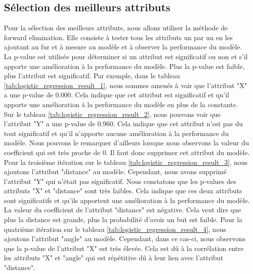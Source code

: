 \documentclass[12pt]{article}
\begin{document}
\subsection{Sélection des meilleurs attributs}
\label{sec:selection_attributs}
Pour la sélection des meilleurs attributs, nous allons utiliser la méthode de forward elimination.
Elle consiste à tester tous les attributs un par un en les ajoutant au fur et à mesure au modèle et à observer la performance du modèle.
La p-value est utilisée pour déterminer si un attribut est significatif ou non et s'il apporte une amélioration à la performance du modèle.
Plus la p-value est faible, plus l'attribut est significatif.
\newline\newline
Par exemple, dans le tableau \ref{tab:logistic_regression_result_1}, nous sommes amenés à voir que l'attribut "X" a une p-value de 0.000.
Cela indique que cet attribut est significatif et qu'il apporte une amélioration à la performance du modèle en plus de la constante.
\newline\newline
Sur le tableau \ref{tab:logistic_regression_result_2}, nous pouvons voir que l'attribut "Y" a une p-value de 0.960.
Cela indique que cet attribut n'est pas du tout significatif et qu'il n'apporte aucune amélioration à la performance du modèle.
Nous pouvons le remarquer d'ailleurs lorsque nous observons la valeur du coefficient qui est très proche de 0.
Il faut donc supprimer cet attribut du modèle.
\newline\newline
Pour la troisième itération sur le tableau \ref{tab:logistic_regression_result_3}, nous ajoutons l'attribut "distance" au modèle.
Cependant, nous avons supprimé l'attribut "Y" qui n'était pas significatif.
Nous constatons que les p-values des attributs "X" et "distance" sont très faibles.
Cela indique que ces deux attributs sont significatifs et qu'ils apportent une amélioration à la performance du modèle.
La valeur du coefficient de l'attribut "distance" est négative. 
Cela veut dire que plus la distance est grande, plus la probabilité d'avoir un but est faible.
\newline\newline
Pour la quatrième itération sur le tableau \ref{tab:logistic_regression_result_4}, nous ajoutons l'attribut "angle" au modèle.
Cependant, dans ce cas-ci, nous observons que la p-value de l'attribut "X" est très élevée. 
Cela est dû à la corrélation entre les attributs "X" et "angle" qui est répétitive dû à leur lien avec l'attribut "distance".
\end{document}
